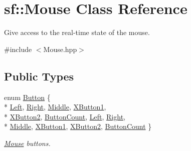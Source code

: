 \hypertarget{classsf_1_1_mouse}{\section{sf\-:\-:Mouse Class Reference}
\label{classsf_1_1_mouse}
}


Give access to the real-\/time state of the mouse.  




{\ttfamily \#include $<$Mouse.\-hpp$>$}

\subsection*{Public Types}
\begin{DoxyCompactItemize}
\item 
enum \hyperlink{classsf_1_1_mouse_a4fb128be433f9aafe66bc0c605daaa90}{Button} \{ \\*
\hyperlink{classsf_1_1_mouse_a4fb128be433f9aafe66bc0c605daaa90a7fedad2e16d5c1dcf61de9eff0dbb501}{Left}, 
\hyperlink{classsf_1_1_mouse_a4fb128be433f9aafe66bc0c605daaa90a64bbf245db73f3b156bc65aa30666831}{Right}, 
\hyperlink{classsf_1_1_mouse_a4fb128be433f9aafe66bc0c605daaa90abb6be270c8c9398b9a0421258b057b76}{Middle}, 
\hyperlink{classsf_1_1_mouse_a4fb128be433f9aafe66bc0c605daaa90a3af65e31680f6b1881897691a42cc934}{X\-Button1}, 
\\*
\hyperlink{classsf_1_1_mouse_a4fb128be433f9aafe66bc0c605daaa90a634ef28ebbf74e5ef62d66c8ed185350}{X\-Button2}, 
\hyperlink{classsf_1_1_mouse_a4fb128be433f9aafe66bc0c605daaa90a8912c097ec6ffbd248c3057b4b95685d}{Button\-Count}, 
\hyperlink{classsf_1_1_mouse_a4fb128be433f9aafe66bc0c605daaa90a7fedad2e16d5c1dcf61de9eff0dbb501}{Left}, 
\hyperlink{classsf_1_1_mouse_a4fb128be433f9aafe66bc0c605daaa90a64bbf245db73f3b156bc65aa30666831}{Right}, 
\\*
\hyperlink{classsf_1_1_mouse_a4fb128be433f9aafe66bc0c605daaa90abb6be270c8c9398b9a0421258b057b76}{Middle}, 
\hyperlink{classsf_1_1_mouse_a4fb128be433f9aafe66bc0c605daaa90a3af65e31680f6b1881897691a42cc934}{X\-Button1}, 
\hyperlink{classsf_1_1_mouse_a4fb128be433f9aafe66bc0c605daaa90a634ef28ebbf74e5ef62d66c8ed185350}{X\-Button2}, 
\hyperlink{classsf_1_1_mouse_a4fb128be433f9aafe66bc0c605daaa90a8912c097ec6ffbd248c3057b4b95685d}{Button\-Count}
 \}
\begin{DoxyCompactList}\small\item\em \hyperlink{classsf_1_1_mouse}{Mouse} buttons. \end{DoxyCompactList}\item 

\end{DoxyCompactItemize}
